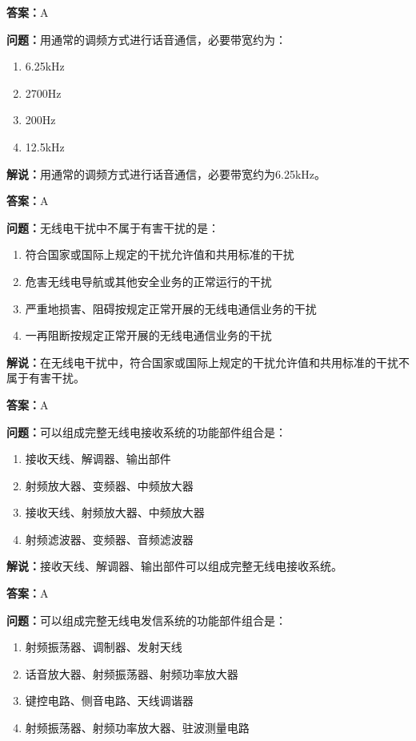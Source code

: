 \textbf{答案：}A

\textbf{问题：}用通常的调频方式进行话音通信，必要带宽约为：

\begin{enumerate}[label=\Alph*), leftmargin=3em]
	\item 6.25kHz
	\item 2700Hz
	\item 200Hz
	\item 12.5kHz
\end{enumerate}

\textbf{解说：}用通常的调频方式进行话音通信，必要带宽约为6.25kHz。%

\textbf{答案：}A

\textbf{问题：}无线电干扰中不属于有害干扰的是：

\begin{enumerate}[label=\Alph*), leftmargin=3em]
	\item 符合国家或国际上规定的干扰允许值和共用标准的干扰
	\item 危害无线电导航或其他安全业务的正常运行的干扰
	\item 严重地损害、阻碍按规定正常开展的无线电通信业务的干扰
	\item 一再阻断按规定正常开展的无线电通信业务的干扰
\end{enumerate}

\textbf{解说：}在无线电干扰中，符合国家或国际上规定的干扰允许值和共用标准的干扰不属于有害干扰。%

\textbf{答案：}A

\textbf{问题：}可以组成完整无线电接收系统的功能部件组合是：

\begin{enumerate}[label=\Alph*), leftmargin=3em]
	\item 接收天线、解调器、输出部件
	\item 射频放大器、变频器、中频放大器
	\item 接收天线、射频放大器、中频放大器
	\item 射频滤波器、变频器、音频滤波器
\end{enumerate}

\textbf{解说：}接收天线、解调器、输出部件可以组成完整无线电接收系统。%

\textbf{答案：}A

\textbf{问题：}可以组成完整无线电发信系统的功能部件组合是：

\begin{enumerate}[label=\Alph*), leftmargin=3em]
	\item 射频振荡器、调制器、发射天线
	\item 话音放大器、射频振荡器、射频功率放大器
	\item 键控电路、侧音电路、天线调谐器
	\item 射频振荡器、射频功率放大器、驻波测量电路
\end{enumerate}

